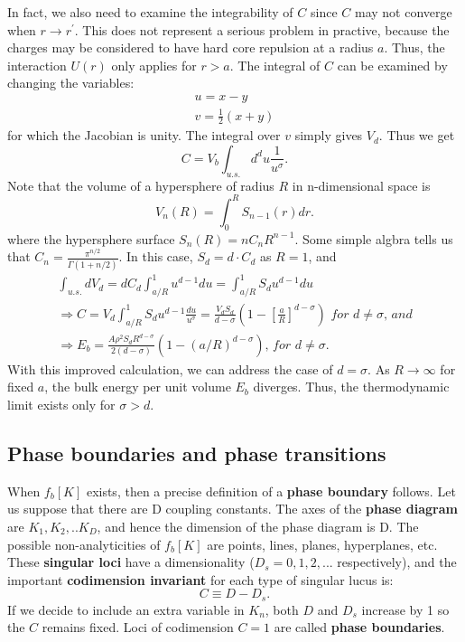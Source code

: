 \documentclass[12pt,titlepage]{article}
\numberwithin{equation}{section}
\begin{document}
In fact, we also need to examine the integrability of $C$ since $C$ may not converge when $r\rightarrow r^{\prime}$. This does not represent a serious problem in practive, because the charges may be considered to have hard core repulsion at a radius $a$. Thus, the interaction $U(r)$ only applies for $r>a$. The integral of $C$ can be examined by changing the variables:
\begin{equation}
    \begin{split}
        u = x -y\\
        v = \frac{1}{2}(x+y)
    \end{split}
\end{equation}
for which the Jacobian is unity. The integral over $v$ simply gives $V_d$. Thus we get
\begin{equation}
    C = V_b\int_{u.s.}d^du\frac{1}{u^{\sigma}}.
\end{equation}
Note that the volume of a hypersphere of radius $R$ in n-dimensional space is
\begin{equation}
    V_n(R)=\int_0^RS_{n-1}(r)dr.
\end{equation}
where the hypersphere surface $S_n(R)=nC_nR^{n-1}$. Some simple algbra tells us that $C_n=\frac{\pi^{n/2}}{\Gamma(1+n/2)}$. In this case, $S_d = d\cdot C_d$ as $R=1$, and 
\begin{equation}
    \begin{split}
        \int_{u.s.}dV_d=dC_d\int_{a/R}^1u^{d-1}du=\int_{a/R}^1S_du^{d-1}du\\
        \Rightarrow C = V_d\int_{a/R}^1 S_du^{d-1}\frac{du}{u^{\sigma}}=\frac{V_dS_d}{d-\sigma}(1-[\frac{a}{R}]^{d-\sigma})\textit{ for  $d\neq\sigma$, and}\\
        \Rightarrow E_b = \frac{A\rho^2S_dR^{d-\sigma}}{2(d-\sigma)}(1-(a/R)^{d-\sigma})\textit{, for $d\neq\sigma$}.
    \end{split}
\end{equation}
With this improved calculation, we can address the case of $d=\sigma$. As $R\rightarrow\infty$ for fixed $a$, the bulk energy per unit volume $E_b$ diverges. Thus, the thermodynamic limit exists only for $\sigma>d$.

\subsection{Phase boundaries and phase transitions}
When $f_b[K]$ exists, then a precise definition of a \textbf{phase boundary} follows. Let us suppose that there are D coupling constants. The axes of the \textbf{phase diagram} are $K_1,K_2,..K_D$, and hence the dimension of the phase diagram is D. The possible non-analyticities of $f_b[K]$ are points, lines, planes, hyperplanes, etc. These \textbf{singular loci} have a dimensionality ($D_s=0,1,2,...$ respectively), and the important \textbf{codimension invariant} for each type of singular lucus is:
\begin{equation}
    C\equiv D-D_s.
\end{equation}
If we decide to include an extra variable in ${K_n}$, both $D$ and $D_s$ increase by 1 so the $C$ remains fixed. Loci of codimension $C=1$ are called \textbf{phase boundaries}.
\end{document}
